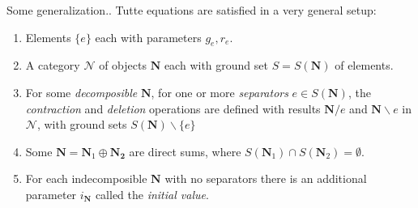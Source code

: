 \documentclass{beamer}
\newcommand{\ext}[1]{\ensuremath{\mathbf{#1}}}
\begin{document}
\begin{frame}{Some generalization..}
  Tutte equations are satisfied in a very general setup:
  \begin{enumerate}
  \item Elements $\{e\}$ each with parameters $g_e, r_e$.
  \item A category $\mathcal{N}$
    of objects $\ext{N}$ each with ground set $S=S(\ext{N})$
    of elements.
  \item For some \emph{decomposible}
    $\ext{N}$, for one or more \emph{separators} $e\in S(\ext{N})$, the
    \emph{contraction} and \emph{deletion} operations are defined with
    results $\ext{N}/e$ and $\ext{N}\backslash e$ in $\mathcal{N}$,
    with ground sets
    $S(\ext{N})\backslash\{e\}$
  \item Some $\ext{N}=\ext{N}_1\oplus\ext{N_2}$ are direct sums, where
    $S(\ext{N}_1)\cap S(\ext{N}_2)=\emptyset$.
  \item For each indecomposible $\ext{N}$ with no separators there is
    an additional parameter $i_{\ext{N}}$ called the \emph{initial value}.
  \end{enumerate}
\end{frame}
\end{document}
